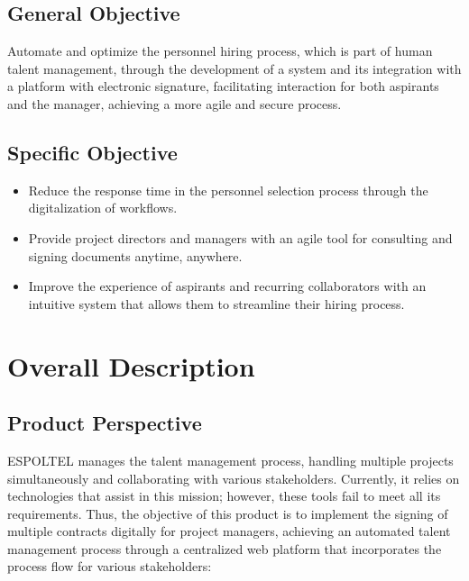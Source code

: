 \documentclass{scrreprt}
\begin{document}
\section{General Objective}
Automate and optimize the personnel hiring process, which is part of human talent management, through the development of a system and its integration with a platform with electronic signature, facilitating interaction for both aspirants and the manager, achieving a more agile and secure process. 

\section{Specific Objective}
\begin{itemize}
    \item Reduce the response time in the personnel selection process through the digitalization of workflows.  
    \item Provide project directors and managers with an agile tool for consulting and signing documents anytime, anywhere.  
    \item Improve the experience of aspirants and recurring collaborators with an intuitive system that allows them to streamline their hiring process. 
\end{itemize}
\chapter{Overall Description}

\section{Product Perspective}

ESPOLTEL manages the talent management process, handling multiple projects simultaneously and collaborating with various stakeholders. Currently, it relies on technologies that assist in this mission; however, these tools fail to meet all its requirements. Thus, the objective of this product is to implement the signing of multiple contracts digitally for project managers, achieving an automated talent management process through a centralized web platform that incorporates the process flow for various stakeholders:
\end{document}
